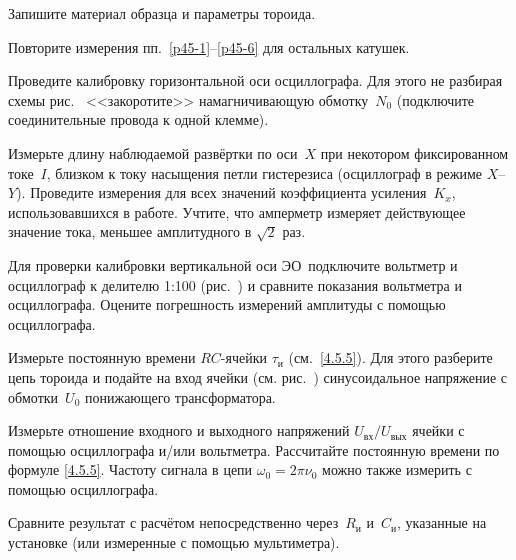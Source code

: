 \begin{lab:task}
\item \label{p45-6} Запишите материал образца и параметры тороида.

\item Повторите измерения пп.~\ref{p45-1}--\ref{p45-6} 
для остальных катушек.


\item \label{p45-8}
Проведите калибровку горизонтальной оси осциллографа. 
Для этого не разбирая схемы рис.~ 
<<закоротите>> намагничивающую обмотку~$N_0$ 
(подключите соединительные провода к одной клемме). 

Измерьте длину наблюдаемой развёртки по оси~$X$ при некотором фиксированном 
токе~$I$, близком к току насыщения петли гистерезиса 
(осциллограф в режиме $X$--$Y$). 
Проведите измерения для всех значений коэффициента усиления~$K_x$, 
использовавшихся в работе. 
Учтите, что амперметр измеряет действующее значение тока, 
меньшее амплитудного в  $\sqrt{2}$ раз.

\item
Для проверки калибровки вертикальной оси ЭО~подключите вольтметр и осциллограф 
к делителю 1:100 (рис.~) и сравните показания
вольтметра и осциллографа. Оцените погрешность измерений амплитуды
с помощью осциллографа.


\item
Измерьте постоянную времени $RC$-ячейки $\tau_{и}$ (см.~\eqref{4.5.5}). 
Для этого разберите цепь тороида и подайте на вход ячейки
(см. рис.~) синусоидальное напряжение 
с обмотки~$U_0$ понижающего трансформатора.

\item Измерьте отношение входного и выходного напряжений 
$U_\text{вх} / U_\text{вых}$ ячейки с помощью осциллографа и/или вольтметра.
Рассчитайте постоянную времени по формуле \eqref{4.5.5}.
Частоту сигнала в цепи $\omega_0=2\pi\nu_0$ 
можно также измерить с помощью осциллографа.


\item Сравните результат с расчётом непосредственно 
через~$R_\text{и}$ и~$C_\text{и}$, указанные на установке
(или измеренные с помощью мультиметра).





\end{lab:task}
